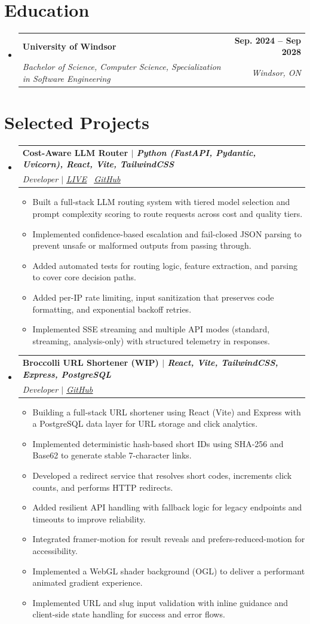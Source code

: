 \documentclass[letterpaper,11pt]{article}
\makeatletter
\newcommand{\resumeItem}[1]{
  \item\small{
    {#1 \vspace{-2pt}}
  }
}
\newcommand{\resumeSubheading}[4]{
  \vspace{-2pt}\item
    \begin{tabular*}{1.0\textwidth}[t]{l@{\extracolsep{\fill}}r}
      \textbf{#1} & \textbf{\small #2} \\
      \textit{\small#3} & \textit{\small #4} \\
    \end{tabular*}\vspace{-7pt}
}
\newcommand{\resumeSubHeadingListStart}{\begin{itemize}[leftmargin=0.0in, label={}]}
\newcommand{\resumeSubHeadingListEnd}{\end{itemize}}
\newcommand{\resumeItemListStart}{\begin{itemize}}
\newcommand{\resumeItemListEnd}{\end{itemize}\vspace{-5pt}}
\makeatother
\begin{document}
\section{Education}
  \resumeSubHeadingListStart
    \resumeSubheading
      {University of Windsor}{Sep. 2024 -- Sep 2028}
      {Bachelor of Science, Computer Science, Specialization in Software Engineering }{Windsor, ON}
  \resumeSubHeadingListEnd




\section{Selected Projects}
\resumeSubHeadingListStart

\resumeSubheading
  {\textbf{Cost-Aware LLM Router} $|$ {\mdseries\itshape Python (FastAPI, Pydantic, Uvicorn), React, Vite, TailwindCSS}}{}
  {Developer $|$ {\upshape \uline{\href{https://model-router-ai-five.vercel.app/}{LIVE}} \textbullet\ \uline{\href{https://github.com/nandth/model-router-ai}{GitHub}}}}{}
\resumeItemListStart
  \resumeItem{Built a full-stack LLM routing system with tiered model selection and prompt complexity scoring to route requests across cost and quality tiers.}
  \resumeItem{Implemented confidence-based escalation and fail-closed JSON parsing to prevent unsafe or malformed outputs from passing through.}
  \resumeItem{Added automated tests for routing logic, feature extraction, and parsing to cover core decision paths.}
  \resumeItem{Added per-IP rate limiting, input sanitization that preserves code formatting, and exponential backoff retries.}
  \resumeItem{Implemented SSE streaming and multiple API modes (standard, streaming, analysis-only) with structured telemetry in responses.}
\resumeItemListEnd
\resumeSubheading
  {\textbf{Broccolli URL Shortener (WIP)} $|$ {\mdseries\itshape React, Vite, TailwindCSS, Express, PostgreSQL}}{}
  {Developer $|$ {\upshape \uline{\href{https://github.com/notaarryan/broccolli-url-shortener}{GitHub}}}}{}
\resumeItemListStart
  \resumeItem{Building a full-stack URL shortener using React (Vite) and Express with a PostgreSQL data layer for URL storage and click analytics.}
  \resumeItem{Implemented deterministic hash-based short IDs using SHA-256 and Base62 to generate stable 7-character links.}
  \resumeItem{Developed a redirect service that resolves short codes, increments click counts, and performs HTTP redirects.}
  \resumeItem{Added resilient API handling with fallback logic for legacy endpoints and timeouts to improve reliability.}
  \resumeItem{Integrated framer-motion for result reveals and prefers-reduced-motion for accessibility.}
  \resumeItem{Implemented a WebGL shader background (OGL) to deliver a performant animated gradient experience.}
  \resumeItem{Implemented URL and slug input validation with inline guidance and client-side state handling for success and error flows.}
\resumeItemListEnd
\resumeSubHeadingListEnd
\end{document}

